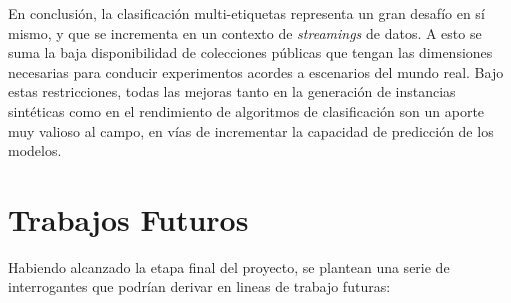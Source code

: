 En conclusión, la clasificación multi-etiquetas representa un gran desafío en sí
mismo, y que se incrementa en un contexto de \textit{streamings} de datos. A
esto se suma la baja disponibilidad de colecciones públicas que tengan las
dimensiones necesarias para conducir experimentos acordes a escenarios del mundo
real. Bajo estas restricciones, todas las mejoras tanto en la generación de
instancias sintéticas como en el rendimiento de algoritmos de clasificación son
un aporte muy valioso al campo, en vías de incrementar la capacidad de
predicción de los modelos.

\section{Trabajos Futuros}

Habiendo alcanzado la etapa final del proyecto, se plantean una serie de
interrogantes que podrían derivar en lineas de trabajo futuras:

